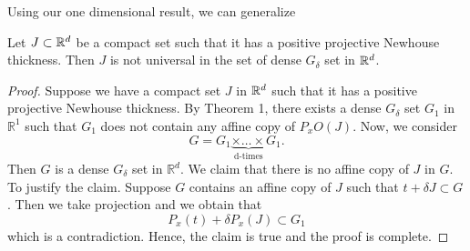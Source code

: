 
Using our one dimensional result, we can generalize 
\begin{theorem}Let $J \subset \mathbb{R}^d$ be a compact set such that it has a positive projective Newhouse thickness. Then $J$ is not universal in the set of dense $G_\delta$ set in $\mathbb{R}^d$.  
\end{theorem}

\begin{proof}  Suppose we have a compact set $J$ in $\mathbb{R}^d$ such that it has a positive projective Newhouse thickness.  By Theorem 1, there exists a dense $G_{\delta}$ set $G_1$ in ${\mathbb R}^1$ such that $G_1$ does not contain any  affine copy of $P_x O(J)$. Now, we consider 
$$
G = G_1\underbrace{\times \dots \times}_\text{d-times} G_1. 
$$
Then $G$ is a dense $G_{\delta}$ set in ${\mathbb R}^d$. We claim that there is no affine copy of $J$ in $G$. To justify the claim. Suppose $G$ contains an affine copy of $J$ such that $t+\delta J\subset G$.  Then we take projection and we obtain that
$$
P_x(t)+ \delta P_x (J) \subset G_1
$$
which is a contradiction. Hence, the claim is true and the proof is complete. 





\end{proof}
